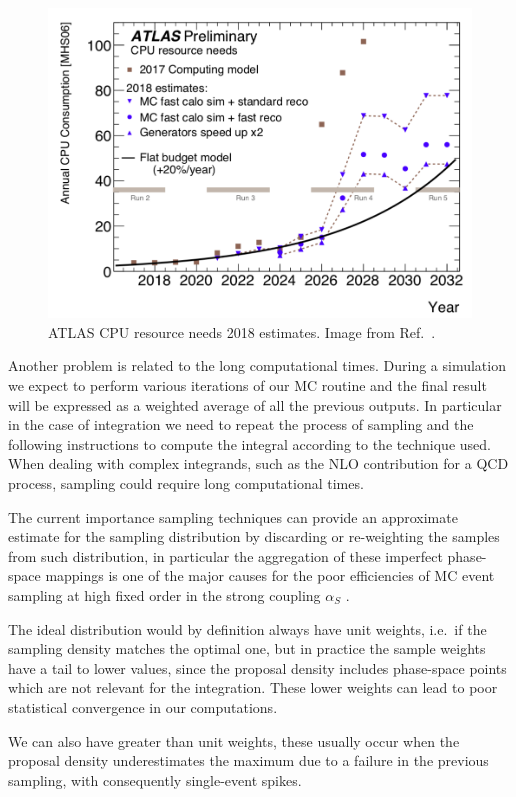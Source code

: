 \documentclass[../main/main.tex]{subfiles}
\begin{document}
\begin{figure}[h]
	\centering
	\includegraphics[width = 12cm]{../images/CPU-cost.png}
	\caption{ATLAS CPU resource needs 2018 estimates. Image from Ref.~\cite{ATL-SOFT-PUB-2021-001}.}
	\label{CPU cost}
\end{figure}

Another problem is related to the long computational times.
During a simulation we expect to perform various iterations of our MC routine and the final result 
will be expressed as a weighted average of all the previous outputs.
In particular in the case of integration we need to repeat the process of sampling and the following instructions to compute the integral according to the technique used. When dealing with complex integrands, such as the NLO contribution for a QCD process, sampling could require long computational times.

The current importance sampling techniques can provide an approximate estimate for the sampling distribution by discarding or re-weighting
the samples from such distribution, in particular the aggregation of these imperfect phase-space mappings is one of the major causes for
the poor efficiencies of MC event sampling at high fixed order in the strong coupling $\alpha_S$ .

The ideal distribution would by definition always have unit weights, i.e.\ if the sampling density matches the optimal one, but in practice 
the sample weights have a tail to lower values, since the proposal density includes phase-space points which are not relevant for the integration.
These lower weights can lead to poor statistical convergence in our computations.

 We can also have greater than unit weights, these usually occur when the proposal density underestimates the maximum due to a failure in the
previous sampling, with consequently single-event spikes.
\end{document}

